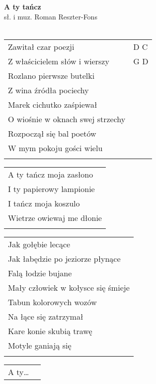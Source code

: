 \documentclass[a5paper]{article}
\begin{document}


\noindent
\fontsize{12pt}{15pt}\selectfont
\textbf{A ty tańcz} \\
\fontsize{8pt}{10pt}\selectfont
sł. i muz. Roman Reszter-Fons \\ \\
\fontsize{10pt}{12pt}\selectfont
{}
\begin{tabular}{@{}p{8.5cm}p{3cm}@{}}
\noindent
Zawitał czar poezji & D C \\
Z właścicielem słów i wierszy & G D \\
Rozlano pierwsze butelki & \\
Z wina źródła pociechy & \\
Marek cichutko zaśpiewał & \\
O wiośnie w oknach swej strzechy & \\
Rozpoczął się bal poetów & \\
W mym pokoju gości wielu & \\ \\
\end{tabular}

\noindent
\begin{tabular}{@{}p{8.5cm}@{}}
A ty tańcz moja zasłono \\
I ty papierowy lampionie \\
I tańcz moja koszulo \\
Wietrze owiewaj me dłonie \\ \\
\end{tabular}

\noindent
\begin{tabular}{@{}p{9.5cm}@{}}
Jak gołębie lecące \\
Jak łabędzie po jeziorze płynące \\
Falą łodzie bujane \\
Mały człowiek w kołysce się śmieje \\
Tabun kolorowych wozów \\
Na łące się zatrzymał \\
Kare konie skubią trawę \\
Motyle ganiają się \\ \\
\end{tabular}

\noindent
\begin{tabular}{@{}p{8.5cm}p{3cm}@{}}
A ty…
\end{tabular}
\end{document}
